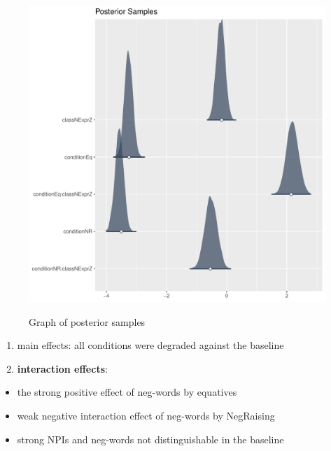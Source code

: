 \documentclass[
  ignorenonframetext,
]{beamer}
\providecommand{\tightlist}{%
  \setlength{\itemsep}{0pt}\setlength{\parskip}{0pt}}\usepackage{longtable,booktabs,array}
\begin{document}
\begin{frame}
\begin{figure}

{\centering 

\href{fig-post-samples}{\includegraphics{posterior_graph.pdf}}

}

\caption{Graph of posterior samples}

\end{figure}
\end{frame}

\begin{frame}
\begin{enumerate}
\item
  main effects: all conditions were degraded against the baseline
\item
  \textbf{interaction effects}:
\end{enumerate}

\begin{itemize}
\tightlist
\item
  the strong positive effect of neg-words by equatives
\item
  weak negative interaction effect of neg-words by NegRaising
\item
  strong NPIs and neg-words not distinguishable in the baseline
\end{itemize}
\end{frame}
\end{document}
